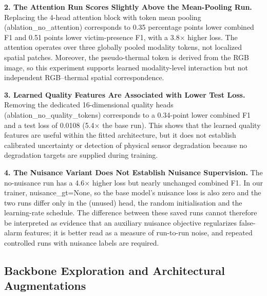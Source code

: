 \documentclass[journal]{IEEEtran}
\begin{document}
\textbf{2. The Attention Run Scores Slightly Above the Mean-Pooling Run.}
Replacing the 4-head attention block with token mean pooling (ablation\_no\_attention) corresponds to 0.35 percentage points lower combined F1 and 0.51 points lower victim-presence F1, with a 3.8$\times$ higher loss. The attention operates over three globally pooled modality tokens, not localized spatial patches. Moreover, the pseudo-thermal token is derived from the RGB image, so this experiment supports learned modality-level interaction but not independent RGB--thermal spatial correspondence.

\textbf{3. Learned Quality Features Are Associated with Lower Test Loss.}
Removing the dedicated 16-dimensional quality heads (ablation\_no\_quality\_tokens) corresponds to a 0.34-point lower combined F1 and a test loss of 0.0108 (5.4$\times$ the base run). This shows that the learned quality features are useful within the fitted architecture, but it does not establish calibrated uncertainty or detection of physical sensor degradation because no degradation targets are supplied during training.

\textbf{4. The Nuisance Variant Does Not Establish Nuisance Supervision.}
The no-nuisance run has a 4.6$\times$ higher loss but nearly unchanged combined F1. In our trainer, nuisance\_gt=None, so the base model's nuisance loss is also zero and the two runs differ only in the (unused) head, the random initialisation and the learning-rate schedule. The difference between these saved runs cannot therefore be interpreted as evidence that an auxiliary nuisance objective regularizes false-alarm features; it is better read as a measure of run-to-run noise, and repeated controlled runs with nuisance labels are required.

\subsection{Backbone Exploration and Architectural Augmentations}
\label{sec:backbone_variants}
\end{document}
